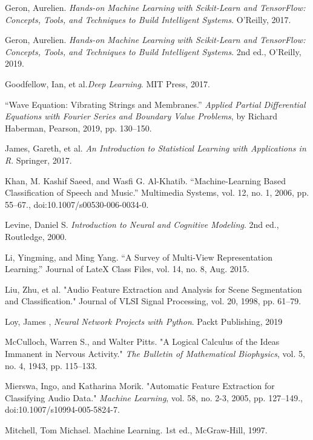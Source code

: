 \documentclass[12pt,letterpaper]{article}
\begin{document}
\begin{thebibliography}{9}


Geron, Aurelien. \textit{Hands-on Machine Learning with Scikit-Learn and TensorFlow: Concepts, Tools, and Techniques to Build Intelligent Systems}. O'Reilly, 2017.

Geron, Aurelien. \textit{Hands-on Machine Learning with Scikit-Learn and TensorFlow: Concepts, Tools, and Techniques to Build Intelligent Systems}. 2nd ed., O'Reilly, 2019.

Goodfellow, Ian, et al.\textit{Deep Learning}. MIT Press, 2017.

“Wave Equation: Vibrating Strings and Membranes.” \textit{Applied Partial Differential Equations with Fourier Series and Boundary Value Problems}, by Richard Haberman, Pearson, 2019, pp. 130–150. 

James, Gareth, et al. \textit{An Introduction to Statistical Learning with Applications in R}. Springer, 2017.

Khan, M. Kashif Saeed, and Wasfi G. Al-Khatib. “Machine-Learning Based Classification of Speech and Music.” Multimedia Systems, vol. 12, no. 1, 2006, pp. 55–67., doi:10.1007/s00530-006-0034-0.

Levine, Daniel S. \textit{Introduction to Neural and Cognitive Modeling}. 2nd ed., Routledge, 2000.

Li, Yingming, and Ming Yang. “A Survey of Multi-View Representation Learning.” Journal of LateX Class Files, vol. 14, no. 8, Aug. 2015. 

Liu, Zhu, et al. "Audio Feature Extraction and Analysis for Scene Segmentation and Classification." Journal of VLSI Signal Processing, vol. 20, 1998, pp. 61–79.

Loy, James , \textit{Neural Network Projects with Python}. Packt Publishing, 2019

McCulloch, Warren S., and Walter Pitts. "A Logical Calculus of the Ideas Immanent in Nervous Activity." \textit{The Bulletin of Mathematical Biophysics}, vol. 5, no. 4, 1943, pp. 115–133.

Mierswa, Ingo, and Katharina Morik. "Automatic Feature Extraction for Classifying Audio Data." \textit{Machine Learning}, vol. 58, no. 2-3, 2005, pp. 127–149., doi:10.1007/s10994-005-5824-7.

Mitchell, Tom Michael. Machine Learning. 1st ed., McGraw-Hill, 1997.


\end{thebibliography}
\end{document}
